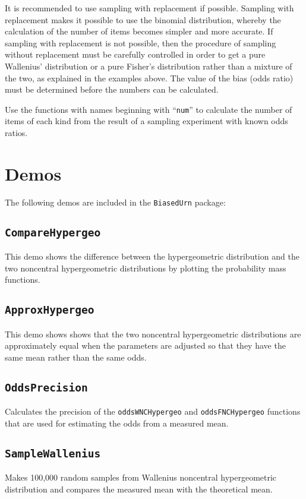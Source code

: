 \documentclass[a4paper]{article}
\begin{document}
It is recommended to use sampling with replacement if possible.  
Sampling with replacement makes it possible to use the binomial
distribution, whereby the calculation of the number of items
becomes simpler and more accurate. If sampling with replacement 
is not possible, then the procedure of sampling without 
replacement must be carefully controlled in order to get a pure 
Wallenius' distribution or a pure Fisher's distribution rather 
than a mixture of the two, as explained in the examples above.
The value of the bias (odds ratio) must be determined before
the numbers can be calculated.

Use the functions with names beginning with ``{\tt num}'' to 
calculate the number of items of each kind from the result
of a sampling experiment with known odds ratios.


\section{Demos}
%
The following demos are included in the {\tt BiasedUrn} package:

\subsection{\tt CompareHypergeo}
%
This demo shows the difference between the hypergeometric distribution
and the two noncentral hypergeometric distributions by plotting
the probability mass functions.

\subsection{\tt ApproxHypergeo}
%
This demo shows shows that the two noncentral hypergeometric 
distributions are approximately equal when the parameters are
adjusted so that they have the same mean rather than the same odds.

\subsection{\tt OddsPrecision}
%
Calculates the precision of the {\tt oddsWNCHypergeo} and {\tt oddsFNCHypergeo}
functions that are used for estimating the odds from a measured mean.

\subsection{\tt SampleWallenius}
%
Makes 100,000 random samples from Wallenius noncentral hypergeometric 
distribution and compares the measured mean with the theoretical mean.
\end{document}
